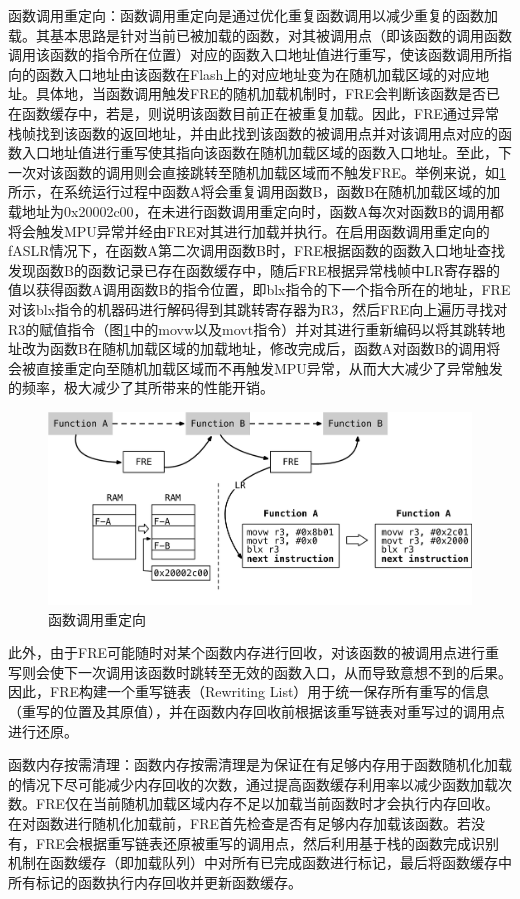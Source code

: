 \documentclass[12pt,a4paper]{ctexart}
\numberwithin{figure}{section}
\begin{document}
\par 函数调用重定向：函数调用重定向是通过优化重复函数调用以减少重复的函数加载。其基本思路是针对当前已被加载的函数，对其被调用点（即该函数的调用函数调用该函数的指令所在位置）对应的函数入口地址值进行重写，使该函数调用所指向的函数入口地址由该函数在Flash上的对应地址变为在随机加载区域的对应地址。具体地，当函数调用触发FRE的随机加载机制时，FRE会判断该函数是否已在函数缓存中，若是，则说明该函数目前正在被重复加载。因此，FRE通过异常栈帧找到该函数的返回地址，并由此找到该函数的被调用点并对该调用点对应的函数入口地址值进行重写使其指向该函数在随机加载区域的函数入口地址。至此，下一次对该函数的调用则会直接跳转至随机加载区域而不触发FRE。举例来说，如\ref{fig:redirection}所示，在系统运行过程中函数A将会重复调用函数B，函数B在随机加载区域的加载地址为0x20002c00，在未进行函数调用重定向时，函数A每次对函数B的调用都将会触发MPU异常并经由FRE对其进行加载并执行。在启用函数调用重定向的fASLR情况下，在函数A第二次调用函数B时，FRE根据函数的函数入口地址查找发现函数B的函数记录已存在函数缓存中，随后FRE根据异常栈帧中LR寄存器的值以获得函数A调用函数B的指令位置，即blx指令的下一个指令所在的地址，FRE对该blx指令的机器码进行解码得到其跳转寄存器为R3，然后FRE向上遍历寻找对R3的赋值指令（图\ref{fig:redirection}中的movw以及movt指令）并对其进行重新编码以将其跳转地址改为函数B在随机加载区域的加载地址，修改完成后，函数A对函数B的调用将会被直接重定向至随机加载区域而不再触发MPU异常，从而大大减少了异常触发的频率，极大减少了其所带来的性能开销。
\begin{figure}[h]
    \centering
    \includegraphics[scale=0.5]{graph/redirection.png}
    \caption{函数调用重定向}
    \label{fig:redirection}
\end{figure}
\par 此外，由于FRE可能随时对某个函数内存进行回收，对该函数的被调用点进行重写则会使下一次调用该函数时跳转至无效的函数入口，从而导致意想不到的后果。因此，FRE构建一个重写链表（Rewriting List）用于统一保存所有重写的信息（重写的位置及其原值），并在函数内存回收前根据该重写链表对重写过的调用点进行还原。
\par 函数内存按需清理：函数内存按需清理是为保证在有足够内存用于函数随机化加载的情况下尽可能减少内存回收的次数，通过提高函数缓存利用率以减少函数加载次数。FRE仅在当前随机加载区域内存不足以加载当前函数时才会执行内存回收。在对函数进行随机化加载前，FRE首先检查是否有足够内存加载该函数。若没有，FRE会根据重写链表还原被重写的调用点，然后利用基于栈的函数完成识别机制在函数缓存（即加载队列）中对所有已完成函数进行标记，最后将函数缓存中所有标记的函数执行内存回收并更新函数缓存。
\end{document}
